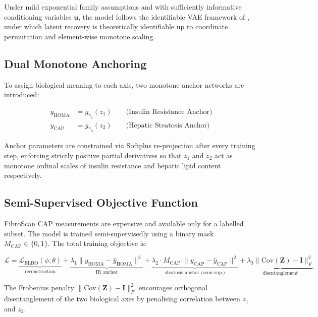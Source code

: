 \documentclass[12pt,a4paper,oneside]{report}
\begin{document}
Under mild exponential family assumptions and with sufficiently informative conditioning variables $\mathbf{u}$, the model follows the identifiable VAE framework of \citet{khemakhem2020}, under which latent recovery is theoretically identifiable up to coordinate permutation and element-wise monotone scaling.

\subsection{Dual Monotone Anchoring}

To assign biological meaning to each axis, two monotone anchor networks are introduced:
\begin{equationbox}
\begin{align}
\hat{y}_{\text{HOMA}} &= g_{\gamma_1}(z_1) \qquad \text{(Insulin Resistance Anchor)} \\
\hat{y}_{\text{CAP}}  &= g_{\gamma_2}(z_2) \qquad \text{(Hepatic Steatosis Anchor)}
\end{align}\vspace{-8pt}
\end{equationbox}

Anchor parameters are constrained via Softplus re-projection after every training step, enforcing strictly positive partial derivatives so that $z_1$ and $z_2$ act as monotone ordinal scales of insulin resistance and hepatic lipid content respectively.

\subsection{Semi-Supervised Objective Function}

FibroScan CAP measurements are expensive and available only for a labelled subset. The model is trained semi-supervisedly using a binary mask $M_{\text{CAP}} \in \{0,1\}$. The total training objective is:
\begin{equationbox}
\[
\mathcal{L} = \underbrace{\mathcal{L}_{\text{ELBO}}(\phi,\theta)}_{\text{reconstruction}} + \underbrace{\lambda_1 \|y_{\text{HOMA}} - \hat{y}_{\text{HOMA}}\|^2}_{\text{IR anchor}} + \underbrace{\lambda_2 \cdot M_{\text{CAP}} \cdot \|y_{\text{CAP}} - \hat{y}_{\text{CAP}}\|^2}_{\text{steatosis anchor (semi-sup.)}} + \underbrace{\lambda_3 \|\mathrm{Cov}(\mathbf{Z}) - \mathbf{I}\|^2_F}_{\text{disentanglement}}
\]\vspace{-4pt}
\end{equationbox}

The Frobenius penalty $\|\mathrm{Cov}(\mathbf{Z}) - \mathbf{I}\|^2_F$ encourages orthogonal disentanglement of the two biological axes by penalising correlation between $z_1$ and $z_2$.
\end{document}
